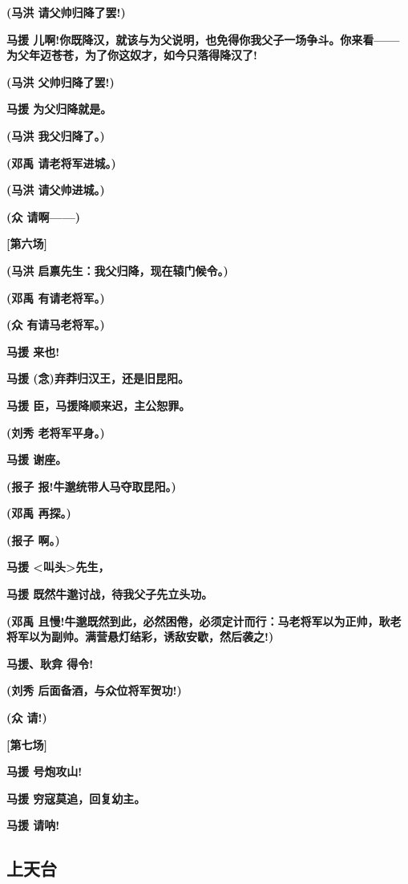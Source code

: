 \textbf{(马洪 请父帅归降了罢!)}

\textbf{马援
儿啊!你既降汉，就该与为父说明，也免得你我父子一场争斗。你来看------为父年迈苍苍，为了你这奴才，如今只落得降汉了!}

\textbf{(马洪 父帅归降了罢!)}

\textbf{马援 为父归降就是。}

\textbf{(马洪 我父归降了。)}

\textbf{(邓禹 请老将军进城。)}

\textbf{(马洪 请父帅进城。)}

\textbf{(众 请啊------)}

\textbf{{[}第六场{]}}

\textbf{(马洪 启禀先生：我父归降，现在辕门候令。)}

\textbf{(邓禹 有请老将军。)}

\textbf{(众 有请马老将军。)}

\textbf{马援 来也!}

\textbf{马援 (念)弃莽归汉王，还是旧昆阳。}

\textbf{马援 臣，马援降顺来迟，主公恕罪。}

\textbf{(刘秀 老将军平身。)}

\textbf{马援 谢座。}

\textbf{(报子 报!牛邈统带人马夺取昆阳。)}

\textbf{(邓禹 再探。)}

\textbf{(报子 啊。)}

\textbf{马援 \textless{}叫头\textgreater{}先生，}

\textbf{马援 既然牛邈讨战，待我父子先立头功。}

\textbf{(邓禹
且慢!牛邈既然到此，必然困倦，必须定计而行：马老将军以为正帅，耿老将军以为副帅。满营悬灯结彩，诱敌安歇，然后袭之!)}

\textbf{马援、耿弇 得令!}

\textbf{(刘秀 后面备酒，与众位将军贺功!)}

\textbf{(众 请!)}

\textbf{{[}第七场{]}}

\textbf{马援 号炮攻山!}

\textbf{马援 穷寇莫追，回复幼主。}

\textbf{马援 请呐!}

\hypertarget{ux4e0aux5929ux53f0}{%
\subsection{上天台}\label{ux4e0aux5929ux53f0}}


